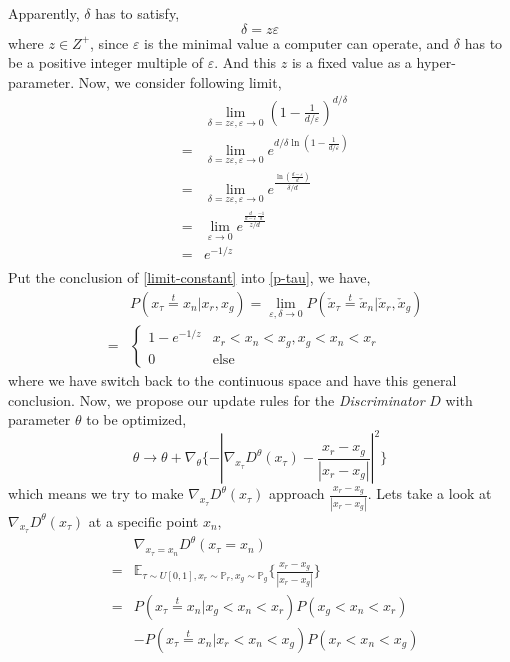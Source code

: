 \documentclass[letterpaper]{article} %
\begin{document}
Apparently, $\delta$ has to satisfy,
\begin{equation}\label{deltal-satisfy}
  \delta = z \varepsilon
\end{equation}
where $z \in Z^{+}$, since $\varepsilon$ is the minimal value a computer can operate, and $\delta$ has to be a positive integer multiple of $\varepsilon$.
And this $z$ is a fixed value as a hyper-parameter.
Now, we consider following limit,
\begin{eqnarray}\label{limit-constant}
    && \lim_{\delta=z\varepsilon,\varepsilon\rightarrow 0} (1-\frac{1}{d/\varepsilon})^{d/\delta} \nonumber\\
    \nonumber &=& \lim_{\delta=z\varepsilon,\varepsilon\rightarrow 0} e^{d/\delta \ln(1-\frac{1}{d/\varepsilon})} \\
    \nonumber &=& \lim_{\delta=z\varepsilon,\varepsilon\rightarrow 0} e^{\frac{\ln(\frac{d-\varepsilon}{d})}{\delta/d}} \\
    \nonumber &=& \lim_{\varepsilon\rightarrow0} e^{\frac{\frac{d}{d-\varepsilon}\frac{-1}{d}}{z/d}} \\
    \nonumber &=& e^{-1/z} \\
\end{eqnarray}
Put the conclusion of \eqref{limit-constant} into \eqref{p-tau}, we have,
\begin{eqnarray}\label{final-p-inter}
    && P(x_\tau\overset{t}{=}x_n|x_r,x_g) = \lim_{\varepsilon,\delta\rightarrow0} P(\check{x}_\tau\overset{t}{=}\check{x}_n|\check{x}_r,\check{x}_g) \nonumber\\
    &=&
    \begin{cases}
        1 - e^{-1/z} &\mbox{$x_r<x_n<x_g,x_g<x_n<x_r$}\\
        0 &\mbox{else}
    \end{cases}
\end{eqnarray}
where we have switch back to the continuous space and have this general conclusion.
Now, we propose our update rules for the \textit{Discriminator} $D$ with parameter $\theta$ to be optimized,
\begin{equation}\label{d-loss}
  \theta \longrightarrow \theta + \nabla_{\theta} \{ - |\nabla_{x_{\tau}}D^{\theta}(x_{\tau})-\frac{x_{r}-x_{g}}{|x_{r}-x_{g}|}|^2 \}
\end{equation}
which means we try to make $\nabla_{x_{\tau}}D^{\theta}(x_{\tau})$ approach $\frac{x_{r}-x_{g}}{|x_{r}-x_{g}|}$. Lets take a look at $\nabla_{x_{\tau}}D^{\theta}(x_{\tau})$ at a specific point $x_n$,
\begin{eqnarray}\label{d-at-xn}
    && \nabla_{x_{\tau}=x_n} D^{\theta}(x_{\tau}=x_n) \nonumber\\
    &=& \mathbb{E}_{\tau \sim U[0,1], x_r\sim\mathbb{P}_r,x_g\sim\mathbb{P}_g} \{\frac{x_{r}-x_{g}}{|x_{r}-x_{g}|}\} \nonumber\\
    &=& P(x_\tau\overset{t}{=}x_n|x_g<x_n<x_r) P(x_g<x_n<x_r) \nonumber\\
    && - P(x_\tau\overset{t}{=}x_n|x_r<x_n<x_g) P(x_r<x_n<x_g) \nonumber\\
\end{eqnarray}
\end{document}
